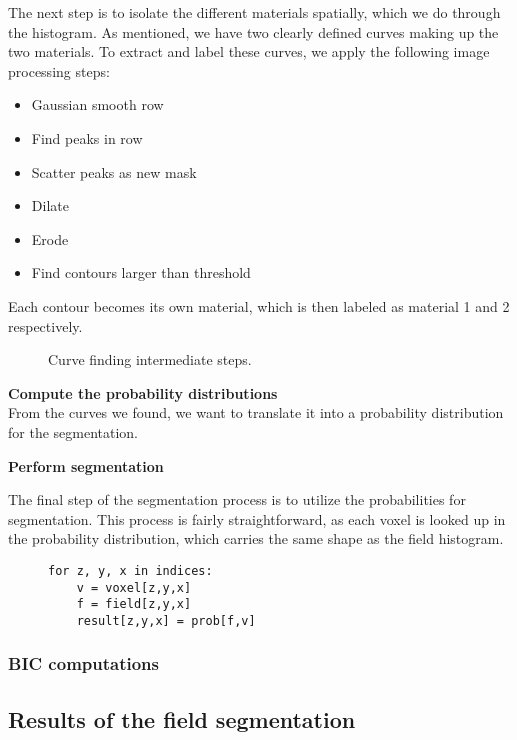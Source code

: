 The next step is to isolate the different materials spatially, which we do through the histogram.
As mentioned, we have two clearly defined curves making up the two materials.
To extract and label these curves, we apply the following image processing steps:
\begin{itemize}
    \item Gaussian smooth row
    \item Find peaks in row
    \item Scatter peaks as new mask
    \item Dilate
    \item Erode
    \item Find contours larger than threshold
\end{itemize}
Each contour becomes its own material, which is then labeled as material 1 and 2 respectively.

\begin{figure}
    \caption{Curve finding intermediate steps.}
    \label{fig:curves}
\end{figure}

\vspace{\baselineskip}
\noindent\textbf{Compute the probability distributions} \\

From the curves we found, we want to translate it into a probability distribution for the segmentation.

\vspace{\baselineskip}
\noindent\textbf{Perform segmentation}

The final step of the segmentation process is to utilize the probabilities for segmentation.
This process is fairly straightforward, as each voxel is looked up in the probability distribution, which carries the same shape as the field histogram.

\begin{figure}
    \begin{lstlisting}
for z, y, x in indices:
    v = voxel[z,y,x]
    f = field[z,y,x]
    result[z,y,x] = prob[f,v]
    \end{lstlisting}
\end{figure}

\subsubsection{BIC computations}

\subsection{Results of the field segmentation}

